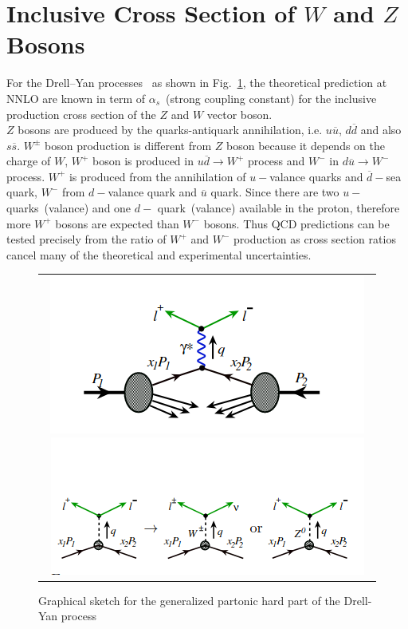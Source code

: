 \section{Inclusive Cross Section of $W$ and $Z$ Bosons  }
For the Drell–Yan processes~\cite{Peng:2016ebs} as shown in Fig.~\ref{drell-yan}, the theoretical prediction at NNLO are known in term of $\alpha_{s}$~(strong coupling constant) for the inclusive production cross section of  the $Z$ and $W$ vector boson.\\
$Z$ bosons are produced by the quarks-antiquark annihilation, i.e. $u\overline{u}$, $d\overline{d}$ and also $s\overline{s}$. $W^{\pm}$ boson production is different from $Z$ boson because it depends on the charge of $W$, $W^{+}$ boson is produced in $u\overline{d}\rightarrow W^{+}$ process and $W^{-}$ in $d\overline{u}\rightarrow W^{-}$ process. $W^{+}$ is produced from the annihilation of $u-$valance quarks and $\overline{d}-$sea quark, $W^{-}$ from $d-$valance quark and $\overline{u}$ quark. Since there are two $u-$ quarks~(valance) and one $d-$ quark~(valance) available in the proton, therefore more $W^{+}$ bosons are expected than $W^{-}$ bosons. Thus QCD predictions can be tested precisely from the ratio of  $W^{+}$ and $W^{-}$ production as cross section ratios cancel many of the theoretical and experimental uncertainties.\\
\begin{figure}[H]
\begin{tabular}{c}
\includegraphics[scale=0.5]{chapter3/drell-yan1.png}
\includegraphics[scale=0.5]{chapter3/drell-yan2.png}
\end{tabular}
\caption{Graphical sketch for the generalized partonic
hard part of the Drell-Yan process~\cite{Peng:2016ebs}}
\label{drell-yan}
\end{figure}
